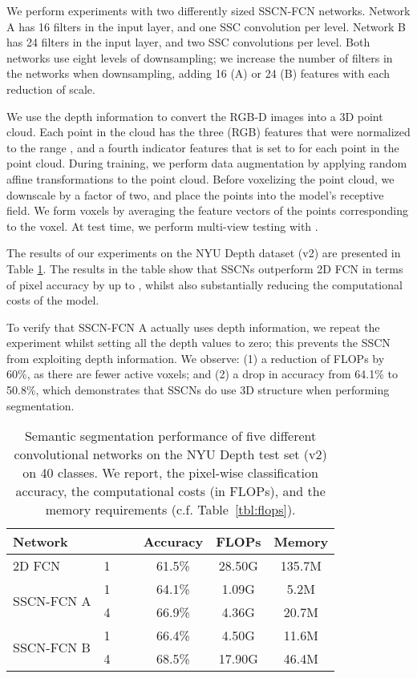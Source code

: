 \documentclass[10pt,twocolumn,letterpaper]{article}
\begin{document}
We perform experiments with two differently sized SSCN-FCN networks.
Network A has 16 filters in the input layer, and one SSC convolution per level.
Network B has 24 filters in the input layer, and two SSC convolutions per level.
Both networks use eight levels of downsampling; we increase the number of filters in the networks when downsampling, adding 16 (A) or 24 (B) features with each reduction of scale.

We use the depth information to convert the RGB-D images into a 3D point cloud. Each point in the cloud has the three (RGB) features that were normalized to the range , and a fourth indicator features that is set to  for each point in the point cloud. During training, we perform data augmentation by applying random affine transformations to the point cloud. Before voxelizing the point cloud, we downscale by a factor of two, and place the points into the model's receptive field. We form voxels by averaging the feature vectors of the points corresponding to the voxel. At test time, we perform multi-view testing with .

The results of our experiments on the NYU Depth dataset (v2) are presented in Table \ref{tbl:nyu}. The results in the table show that SSCNs outperform 2D FCN in terms of pixel accuracy by up to , whilst also substantially reducing the computational costs of the model.

To verify that SSCN-FCN A actually uses depth information, we repeat the experiment whilst setting all the depth values to zero; this prevents the SSCN from exploiting depth information. We observe: (1) a reduction of FLOPs by 60\%, as there are fewer active voxels; and (2) a drop in accuracy from 64.1\% to 50.8\%, which demonstrates that SSCNs do use 3D structure when performing segmentation.


\begin{table}[t]
\centering{}
\begin{tabular}{lccccc}
    \toprule
    \textbf{Network}        &\textbf{} &~& \textbf{Accuracy}  & \textbf{FLOPs}  &  \textbf{Memory}\\
    \midrule
    2D FCN \cite{long2015fully}  &1 && 61.5\% & 28.50G & 135.7M \\
    \midrule
    \multirow{2}{*}{SSCN-FCN A} &1 && 64.1\% &  1.09G &  5.2M  \\
     &4 && 66.9\% &  4.36G & 20.7M  \\
    \multirow{2}{*}{SSCN-FCN B}  &1 && 66.4\% &  4.50G & 11.6M  \\
    &4 && 68.5\% & 17.90G & 46.4M  \\
    \bottomrule
\end{tabular}
\caption{Semantic segmentation performance of five different convolutional networks on the NYU Depth test set (v2) on 40 classes. We report, the pixel-wise classification accuracy, the computational costs (in FLOPs), and the memory requirements (c.f. Table~\ref{tbl:flops}).}\label{tbl:nyu}
\end{table}
\end{document}
